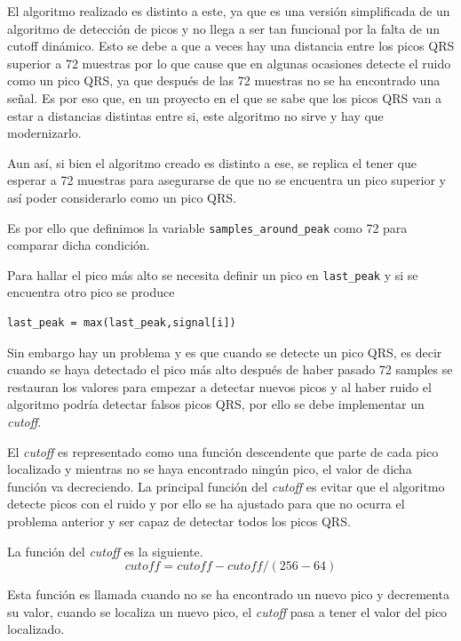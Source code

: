 El algoritmo realizado es distinto a este, ya que es una versión simplificada de un algoritmo de detección de picos y no llega a ser tan 
funcional por la falta de un cutoff dinámico. Esto se debe a que a veces hay una distancia entre los picos QRS superior a 72 muestras 
por lo que cause que en algunas ocasiones detecte el ruido como un pico QRS, ya que después de las 72 muestras no se ha encontrado una señal.
Es por eso que, en un proyecto en el que se sabe que los picos QRS van a estar a distancias distintas entre si, este algoritmo no sirve y 
hay que modernizarlo.

Aun así, si bien el algoritmo creado es distinto a ese, se replica el tener que esperar a 72 muestras
para asegurarse de que no se encuentra un pico superior y así poder considerarlo como un pico QRS.

Es por ello que definimos la variable \lstinline|samples_around_peak| como 72 para comparar dicha condición.

Para hallar el pico más alto se necesita definir un pico en \lstinline|last_peak| y si se encuentra otro pico se produce

\lstset{language=python, breaklines=true, basicstyle=\footnotesize}
\begin{lstlisting}[frame=single]
last_peak = max(last_peak,signal[i])
\end{lstlisting}

Sin embargo hay un problema y es que cuando se detecte un pico QRS, es decir cuando se haya detectado el pico 
más alto después de haber pasado 72 samples se restauran los valores para empezar a detectar nuevos picos y al
haber ruido el algoritmo podría detectar falsos picos QRS, por ello se debe implementar un \textit{cutoff}.

El \textit{cutoff} es representado como una función descendente que parte de cada pico localizado y mientras no se haya
encontrado ningún pico, el valor de dicha función va decreciendo. La principal función del \textit{cutoff} es evitar que
el algoritmo detecte picos con el ruido y por ello se ha ajustado para que no ocurra el problema anterior y 
ser capaz de detectar todos los picos QRS.\@

La función del \textit{cutoff} es la siguiente.
    \[cutoff = cutoff - cutoff/(256 - 64)\]


Esta función es llamada cuando no se ha encontrado un nuevo pico y decrementa su valor, cuando se localiza un
nuevo pico, el \textit{cutoff} pasa a tener el valor del pico localizado.

